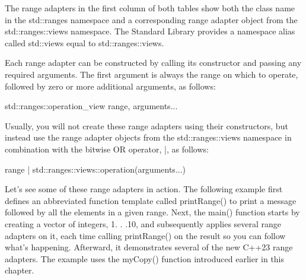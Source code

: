 The range adapters in the first column of both tables show both the class name in the std::ranges namespace and a corresponding range adapter object from the std::ranges::views namespace. The Standard Library provides a namespace alias called std::views equal to std::ranges::views.

Each range adapter can be constructed by calling its constructor and passing any required arguments.
The first argument is always the range on which to operate, followed by zero or more additional arguments, as follows:

\begin{cpp}
std::ranges::operation_view { range, arguments... }
\end{cpp}

Usually, you will not create these range adapters using their constructors, but instead use the range adapter objects from the std::ranges::views namespace in combination with the bitwise OR operator, |, as follows:

\begin{cpp}
range | std::ranges::views::operation(arguments...)
\end{cpp}

Let’s see some of these range adapters in action. The following example first defines an abbreviated function template called printRange() to print a message followed by all the elements in a given range. Next, the main() function starts by creating a vector of integers, 1. . .10, and subsequently applies several range adapters on it, each time calling printRange() on the result so you can follow what’s happening. Afterward, it demonstrates several of the new C++23 range adapters. The example uses the myCopy() function introduced earlier in this chapter.

